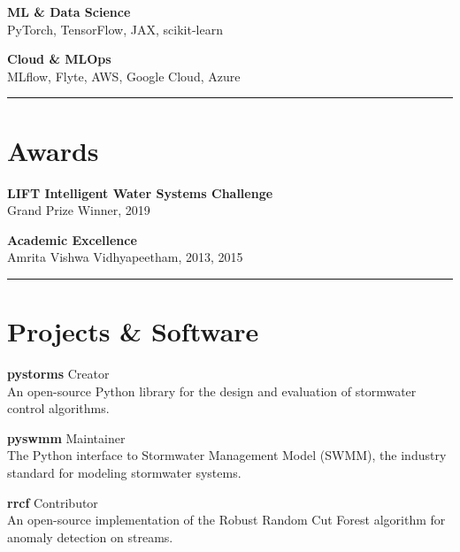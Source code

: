 \documentclass{article}
\newcommand{\divider}{\textcolor{tuftegray}{\rule{\linewidth}{0.5pt}}}
\begin{document}
\begin{paracol}{2}
\begin{flushleft}
\textbf{ML \& Data Science}\\
{\small PyTorch, TensorFlow, JAX, scikit-learn}
\vspace{0.8em}

\textbf{Cloud \& MLOps}\\
{\small MLflow, Flyte, AWS, Google Cloud, Azure}
\vspace{1em}
\divider
\vspace{1em}

\section{Awards}
\vspace{0.5em}
\textbf{LIFT Intelligent Water Systems Challenge}\\
{\small\textcolor{tuftegray}{Grand Prize Winner, 2019}}
\vspace{0.8em}

\textbf{Academic Excellence}\\
{\small\textcolor{tuftegray}{Amrita Vishwa Vidhyapeetham, 2013, 2015}}
\vspace{1em}
\divider
\vspace{1em}

\section{Projects \& Software}
\textbf{pystorms} \hfill \textcolor{tuftegray}{Creator}\\
{\small An open-source Python library for the design and evaluation of stormwater control algorithms.}
\vspace{0.8em}

\textbf{pyswmm} \hfill \textcolor{tuftegray}{Maintainer}\\
{\small The Python interface to Stormwater Management Model (SWMM), the industry standard for modeling stormwater systems.}
\vspace{0.8em}

\textbf{rrcf} \hfill \textcolor{tuftegray}{Contributor}\\
{\small An open-source implementation of the Robust Random Cut Forest algorithm for anomaly detection on streams.}




\end{flushleft}
\end{paracol}
\end{document}
